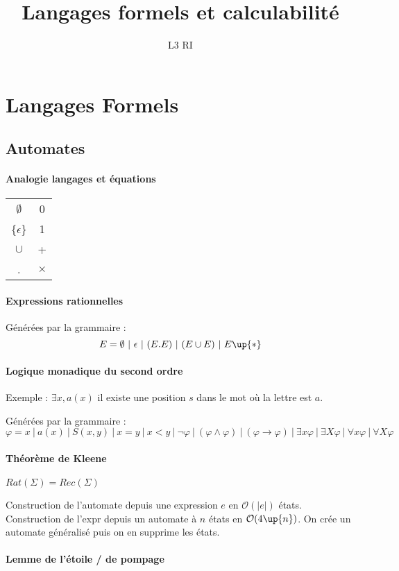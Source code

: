 \documentclass[french]{article}
\title{Langages formels et calculabilité}
\date{}
\author{L3 RI}
\begin{document}
\maketitle
\tableofcontents
\section{Langages Formels}
\subsection{Automates}
\paragraph{Analogie langages et équations}
\begin{tabular}{c|c}
$\emptyset$ & 0\\
\{$\epsilon$\} & 1\\
$\cup$ & +\\
. & $\times$
\end{tabular}

\paragraph{Expressions rationnelles}
Générées par la grammaire :
$$E = \emptyset~|~\epsilon~|~(E.E)~|~(E\cup E)~|~E\up{*}$$

\paragraph{Logique monadique du second ordre}

Exemple : $\exists x, a(x)$ il existe une position $s$ dans le mot où la lettre est $a$.

Générées par la grammaire :
$$\varphi = x~|~a(x)~|~S(x,y)~|~x=y~|~x<y~|~\neg\varphi~|~(\varphi\wedge\varphi)~|~(\varphi\rightarrow\varphi)~|~\exists x\varphi~|~\exists X\varphi~|~\forall x\varphi~|~\forall X\varphi$$

\paragraph{Théorème de Kleene} $Rat(\Sigma) = Rec(\Sigma)$

Construction de l'automate depuis une expression $e$ en $\mathcal{O}(|e|)$ états. Construction de l'expr depuis un automate à $n$ états en $\mathcal{O}(4\up{n})$. On crée un automate généralisé puis on en supprime les états.

\paragraph{Lemme de l'étoile / de pompage}
\end{document}

